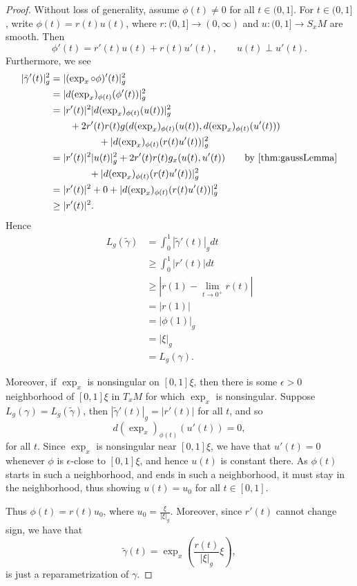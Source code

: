 \begin{proof}
Without loss of generality, assume $\phi(t)\neq0$ for all $t\in(0,1]$.  For $t\in(0,1]$, write $\phi(t)=r(t)u(t)$, where $r:(0,1]\to(0,\infty)$ and $u:(0,1]\to S_xM$ are smooth.  Then
$$\phi'(t)=r'(t)u(t)+r(t)u'(t),\qquad u(t)\perp u'(t).$$
Furthermore, we see
\begin{align*}
	|\tilde{\gamma}'(t)|_g^2&=|(\exp_x\circ\phi)'(t)|_g^2\\
	&=|d(\exp_x)_{\phi(t)}(\phi'(t))|_g^2\\
	&=|r'(t)|^2|d(\exp_x)_{\phi(t)}(u(t))|_g^2\\
	&\qquad+2r'(t)r(t)g(d(\exp_x)_{\phi(t)}(u(t)),d(\exp_x)_{\phi(t)}(u'(t)))\\
	&\qquad\qquad\quad+|d(\exp_x)_{\phi(t)}(r(t)u'(t))|_g^2\\
	&=|r'(t)|^2|u(t)|_g^2+2r'(t)r(t)g_x(u(t),u'(t))\qquad\text{by \cref{thm:gaussLemma}}\\
	&\qquad\qquad+|d(\exp_x)_{\phi(t)}(r(t)u'(t))|_g^2\\
	&=|r'(t)|^2+0+|d(\exp_x)_{\phi(t)}(r(t)u'(t))|_g^2\\
	&\geq|r'(t)|^2.
\end{align*}
Hence
\begin{align*}
	L_g(\tilde{\gamma})&=\int_0^1|\tilde{\gamma}'(t)|_gdt\\
	&\geq\int_0^1|r'(t)|dt\\
	&\geq\left|r(1)-\lim_{t\to0^+}r(t)\right|\\
	&=|r(1)|\\
	&=|\phi(1)|_g\\
	&=|\xi|_g\\
	&=L_g(\gamma).
\end{align*}

Moreover, if $\exp_x$ is nonsingular on $[0,1]\xi$, then there is some $\epsilon>0$ neighborhood of $[0,1]\xi$ in $T_xM$ for which $\exp_x$ is nonsingular.  Suppose $L_g(\gamma)=L_g(\tilde{\gamma})$, then $|\tilde{\gamma}'(t)|_g=|r'(t)|$ for all $t$, and so
$$d(\exp_x)_{\phi(t)}(u'(t))=0,$$
for all $t$.  Since $\exp_x$ is nonsingular near $[0,1]\xi$, we have that $u'(t)=0$ whenever $\phi$ is $\epsilon$-close to $[0,1]\xi$, and hence $u(t)$ is constant there.  As $\phi(t)$ starts in such a neighborhood, and ends in such a neighborhood, it must stay in the neighborhood, thus showing $u(t)=u_0$ for all $t\in[0,1]$.

Thus $\phi(t)=r(t)u_0$, where $u_0=\frac{\xi}{|\xi|_g}$.  Moreover, since $r'(t)$ cannot change sign, we have that
$$\tilde{\gamma}(t)=\exp_x\left(\frac{r(t)}{|\xi|_g}\xi\right),$$
is just a reparametrization of $\gamma$.
\end{proof}




